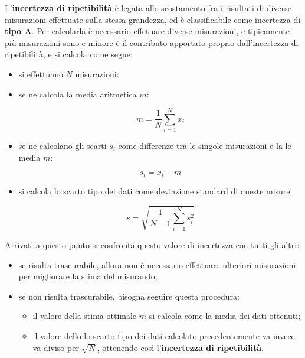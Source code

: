 \documentclass[a4paper, twoside]{article}
\begin{document}
L'\textbf{incertezza di ripetibilità} è legata allo scostamento fra i risultati di diverse misurazioni effettuate sulla stessa grandezza, ed è classificabile come incertezza di \textbf{tipo A}. Per calcolarla è necessario effetuare diverse misurazioni, e tipicamente più misurazioni sono e minore è il contributo apportato proprio dall'incertezza di ripetibilità, e si calcola come segue:

\begin{itemize}
    \item si effettuano $N$ misurazioni:
    \item se ne calcola la media aritmetica $m$:

        \begin{equation}
            m = \frac{1}{N} \sum_{i=1}^{N} x_i
        \end{equation}

    \item se ne calcolano gli scarti $s_i$ come differenze tra le singole misurazioni e la le media $m$:
    
    \begin{equation}
        s_i = x_i - m
    \end{equation}    

    \item si calcola lo scarto tipo dei dati come deviazione standard di queste misure:
    
    \begin{equation}
        s = \sqrt{\frac{1}{N-1} \sum_{i=1}^{N} s_i^2}
    \end{equation}

\end{itemize}

\noindent
Arrivati a questo punto si confronta questo valore di incertezza con tutti gli altri:

\begin{itemize}
    \item se risulta trascurabile, allora non è necessario effettuare ulteriori misurazioni per migliorare la stima del misurando;
    \item se non risulta trascurabile, bisogna seguire questa procedura:
    
    \begin{itemize}
        \item il valore della stima ottimale $m$ si calcola come la media dei dati ottenuti;
        \item il valore dello lo scarto tipo dei dati calcolato precedentemente va invece va diviso per $\sqrt{N}$, ottenendo così l'\textbf{incertezza di ripetibilità}.
    \end{itemize}

\end{itemize}
\end{document}
